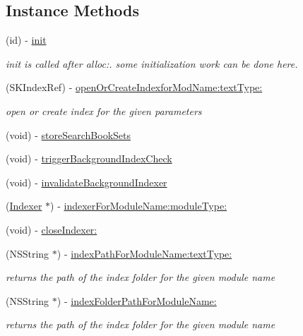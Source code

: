 \subsection*{Instance Methods}
\begin{DoxyCompactItemize}
\item 
(id) -\/ \hyperlink{interface_indexing_manager_a4213bb26f5207ee3f402fe463badc691}{init}
\begin{DoxyCompactList}\small\item\em init is called after alloc\-:. some initialization work can be done here. \end{DoxyCompactList}\item 
(S\-K\-Index\-Ref) -\/ \hyperlink{interface_indexing_manager_ae29221a94d1b39d8cab62acdcd886eed}{open\-Or\-Create\-Indexfor\-Mod\-Name\-:text\-Type\-:}
\begin{DoxyCompactList}\small\item\em open or create index for the given parameters \end{DoxyCompactList}\item 
(void) -\/ \hyperlink{interface_indexing_manager_ae4e9d1ddd1e2a7588da243a83027008c}{store\-Search\-Book\-Sets}
\item 
(void) -\/ \hyperlink{interface_indexing_manager_a16d11aa0606b5d889a8bfef5321dee8d}{trigger\-Background\-Index\-Check}
\item 
(void) -\/ \hyperlink{interface_indexing_manager_ab4ddaa4f4e9e68b76e76ec2cbaad7555}{invalidate\-Background\-Indexer}
\item 
(\hyperlink{interface_indexer}{Indexer} $\ast$) -\/ \hyperlink{interface_indexing_manager_a5635f99b3981c2847444d1e497e3468c}{indexer\-For\-Module\-Name\-:module\-Type\-:}
\item 
(void) -\/ \hyperlink{interface_indexing_manager_a52455a543b3cc1956453b155f0b68518}{close\-Indexer\-:}
\item 
(N\-S\-String $\ast$) -\/ \hyperlink{interface_indexing_manager_a8ef24975159d5855a0e625b91404f7a5}{index\-Path\-For\-Module\-Name\-:text\-Type\-:}
\begin{DoxyCompactList}\small\item\em returns the path of the index folder for the given module name \end{DoxyCompactList}\item 
(N\-S\-String $\ast$) -\/ \hyperlink{interface_indexing_manager_a2e60b5d0fe5ffd5b684dd17d591bd049}{index\-Folder\-Path\-For\-Module\-Name\-:}
\begin{DoxyCompactList}\small\item\em returns the path of the index folder for the given module name \end{DoxyCompactList}\item 

\end{DoxyCompactItemize}
